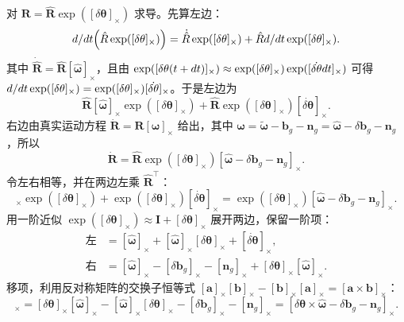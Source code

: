 对 $\bm{R}=\hat{\bm{R}}\exp([\delta\bm{\theta}]_\times)$ 求导。先算左边：
\begin{equation}
  d/d t\Bigl(\hat{R}\exp([\delta\theta]_\times)\Bigr)
  =\dot{\hat{R}}\exp([\delta\theta]_\times)+\hat{R}d/d t\exp([\delta\theta]_\times).
\end{equation}
其中 $\dot{\hat{\bm{R}}}=\hat{\bm{R}}[\hat{\bm{\omega}}]_\times$，且由 $\exp([\delta\theta(t+d t)]_\times)\approx\exp([\delta\theta]_\times)\exp([\dot{\delta\theta}d t]_\times)$ 可得 $d/d t\exp([\delta\theta]_\times)=\exp([\delta\theta]_\times)[\dot{\delta\theta}]_\times$。于是左边为
\begin{equation}
  \hat{\bm{R}}[\hat{\bm{\omega}}]_\times\exp([\delta\bm{\theta}]_\times)+\hat{\bm{R}}\exp([\delta\bm{\theta}]_\times)[\dot{\delta\bm{\theta}}]_\times.
\end{equation}
右边由真实运动方程 $\dot{\bm{R}}=\bm{R}[\bm{\omega}]_\times$ 给出，其中 $\bm{\omega}=\tilde{\bm{\omega}}-\bm{b}_g-\bm{n}_g=\hat{\bm{\omega}}-\delta\bm{b}_g-\bm{n}_g$，所以
\begin{equation}
  \dot{\bm{R}}=\hat{\bm{R}}\exp([\delta\bm{\theta}]_\times)[\hat{\bm{\omega}}-\delta\bm{b}_g-\bm{n}_g]_\times.
\end{equation}
令左右相等，并在两边左乘 $\hat{\bm{R}}^{\top}$：
\begin{equation}
  [\hat{\bm{\omega}}]_\times\exp([\delta\bm{\theta}]_\times)+\exp([\delta\bm{\theta}]_\times)[\dot{\delta\bm{\theta}}]_\times
  =\exp([\delta\bm{\theta}]_\times)[\hat{\bm{\omega}}-\delta\bm{b}_g-\bm{n}_g]_\times.
\end{equation}
用一阶近似 $\exp([\delta\bm{\theta}]_\times)\approx\bm{I}+[\delta\bm{\theta}]_\times$ 展开两边，保留一阶项：
\begin{align}
  \text{左}&=[\hat{\bm{\omega}}]_\times+[\hat{\bm{\omega}}]_\times[\delta\bm{\theta}]_\times+[\dot{\delta\bm{\theta}}]_\times,\\
  \text{右}&=[\hat{\bm{\omega}}]_\times-[\delta\bm{b}_g]_\times-[\bm{n}_g]_\times+[\delta\bm{\theta}]_\times[\hat{\bm{\omega}}]_\times.
\end{align}
移项，利用反对称矩阵的交换子恒等式 $[\bm{a}]_\times[\bm{b}]_\times-[\bm{b}]_\times[\bm{a}]_\times=[\bm{a}\times\bm{b}]_\times$：
\begin{equation}
  [\dot{\delta\bm{\theta}}]_\times=[\delta\bm{\theta}]_\times[\hat{\bm{\omega}}]_\times-[\hat{\bm{\omega}}]_\times[\delta\bm{\theta}]_\times-[\delta\bm{b}_g]_\times-[\bm{n}_g]_\times
  =[\delta\bm{\theta}\times\hat{\bm{\omega}}-\delta\bm{b}_g-\bm{n}_g]_\times.
\end{equation}
